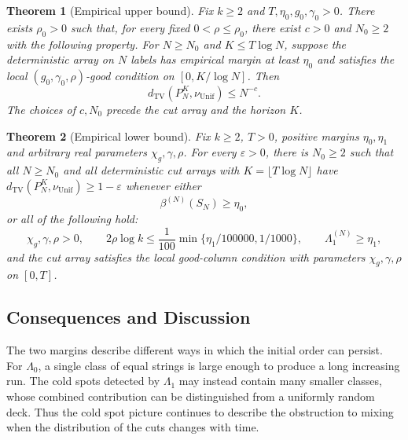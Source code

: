 \documentclass[11pt]{article}
\numberwithin{equation}{section}
\newtheorem{theorem}{Theorem}[section]
\theoremstyle{definition}
\theoremstyle{remark}
\newcommand{\TV}{\mathrm{TV}}
\newcommand{\Unif}{\mathrm{Unif}}
\newcommand{\dTV}{d_{\TV}}
\newcommand{\nuUnif}{\nu_{\Unif}}
\newcommand{\1}{\mathbf 1}
\begin{document}
\begin{theorem}[Empirical upper bound]%
\label{thm:upper-empirical}
Fix $k\ge2$ and $T,\eta_0,g_0,\gamma_0>0$. There exists $\rho_0>0$
such that, for every fixed $0<\rho\le\rho_0$, there exist $c>0$ and
$N_0\ge2$ with the following property. For $N\ge N_0$ and
$K\le T\log N$, suppose the deterministic array on $N$ labels has
empirical margin at least $\eta_0$ and satisfies the local
$(g_0,\gamma_0,\rho)$-good condition on $[0,K/\log N]$. Then
\begin{equation}\label{eq:upper-empirical-tv}
 \dTV(P_N^K,\nuUnif)\le N^{-c}.
\end{equation}
The choices of $c,N_0$ precede the cut array and the horizon $K$.
\end{theorem}

\begin{theorem}[Empirical lower bound]%
\label{thm:empirical-lower}
Fix $k\ge2$, $T>0$, positive margins $\eta_0,\eta_1$ and arbitrary real parameters
$\chi_g,\gamma,\rho$. For every $\varepsilon>0$, there is $N_0\ge2$ such
that all $N\ge N_0$ and all deterministic cut arrays with $K=\lfloor T\log N\rfloor$ have
$\dTV(P_N^K,\nuUnif)\ge1-\varepsilon$ whenever either
\[
 \beta^{(N)}(S_N)\ge\eta_0,
\]
or all of the following hold:
\[
 \chi_g,\gamma,\rho>0,\qquad
 2\rho\log k\le\frac1{100}\min\{\eta_1/100000,1/1000\},\qquad
 \Lambda_1^{(N)}\ge\eta_1,
\]
and the cut array satisfies the local good-column condition with
parameters $\chi_g,\gamma,\rho$ on $[0,T]$.
\end{theorem}

\subsection{Consequences and Discussion}

The two margins describe different ways in which the initial order can
persist. For $\Lambda_0$, a single class of equal strings is large
enough to produce a long increasing run. The cold spots detected by
$\Lambda_1$ may instead contain many smaller classes, whose combined
contribution can be distinguished from a uniformly random deck. Thus the
cold spot picture continues to describe the obstruction to mixing when
the distribution of the cuts changes with time.
\end{document}
